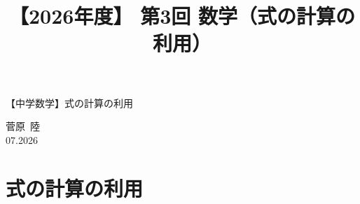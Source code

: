 \documentclass[12pt,a4paper]{jsarticle}
\title{【2026年度】 第3回 数学（式の計算の利用）}
\author{}
\date{}
\begin{document}
\setcounter{section}{-1}


\begin{center}
{\LARGE 【中学数学】式の計算の利用}
\end{center}

\vspace{5mm}
\begin{flushright}
  菅原\ 陸\\[1.2em]
  07.2026
\end{flushright}

\section{式の計算の利用}

\setcounter{subsection}{0}


\bookletpadpages
\end{document}
